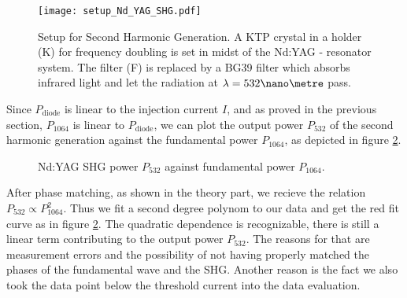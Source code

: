 \begin{figure}[p]
	\centering
	\texttt{[image: setup\_Nd\_YAG\_SHG.pdf]}
	\caption[Setup for Second Harmonic Generation]{Setup for Second Harmonic Generation. A KTP crystal in a holder (K) for frequency doubling is set in midst of the Nd:YAG - resonator system. The filter (F) is replaced by a BG39 filter which absorbs infrared light and let the radiation at $\lambda=532\nano\metre$ pass. \cite{lit:manual}}
	\label{fig:setup_Nd:YAG_SHG}
\end{figure}

Since $P_\text{diode}$ is linear to the injection current $I$, and as proved in the previous section, $P_{1064}$ is linear to $P_\text{diode}$, we can plot the output power $P_{532}$ of the second harmonic generation against the fundamental power $P_{1064}$, as depicted in figure \ref{fig:P532}.

\begin{figure}[p]
	\centering
	
	\caption{Nd:YAG SHG power $P_{532}$ against fundamental power $P_{1064}$.}
	\label{fig:P532}
	\vspace{-1em}
\end{figure}

After phase matching, as shown in the theory part, we recieve the relation $ P_{532}\propto P_{1064}^2$. Thus we fit a second degree polynom to our data and get the red fit curve as in figure \ref{fig:P532}. The quadratic dependence is recognizable, there is still a linear term contributing to the output power $P_{532}$. The reasons for that are measurement errors and the possibility of not having properly matched the phases of the fundamental wave and the SHG. Another reason is the fact we also took the data point below the threshold current into the data evaluation.